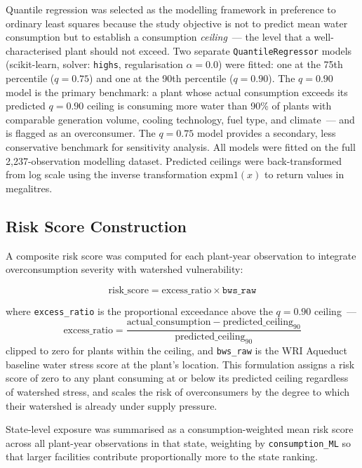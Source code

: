 \documentclass[11pt, letterpaper]{article}
\begin{document}
Quantile regression was selected as the modelling framework in preference to ordinary least squares because the study objective is not to predict mean water consumption but to establish a consumption \textit{ceiling}~--- the level that a well-characterised plant should not exceed. Two separate \texttt{QuantileRegressor} models (scikit-learn, solver: \texttt{highs}, regularisation $\alpha = 0.0$) were fitted: one at the 75th percentile ($q = 0.75$) and one at the 90th percentile ($q = 0.90$). The $q = 0.90$ model is the primary benchmark: a plant whose actual consumption exceeds its predicted $q = 0.90$ ceiling is consuming more water than 90\% of plants with comparable generation volume, cooling technology, fuel type, and climate~--- and is flagged as an overconsumer. The $q = 0.75$ model provides a secondary, less conservative benchmark for sensitivity analysis. All models were fitted on the full 2{,}237-observation modelling dataset. Predicted ceilings were back-transformed from log scale using the inverse transformation $\text{expm1}(x)$ to return values in megalitres.

\subsection{Risk Score Construction}

A composite risk score was computed for each plant-year observation to integrate overconsumption severity with watershed vulnerability:

\begin{equation}
  \text{risk\_score} = \text{excess\_ratio} \times \texttt{bws\_raw}
\end{equation}

where \texttt{excess\_ratio} is the proportional exceedance above the $q = 0.90$ ceiling~---
\[
  \text{excess\_ratio} = \frac{\text{actual\_consumption} - \text{predicted\_ceiling}_{90}}{\text{predicted\_ceiling}_{90}}
\]
clipped to zero for plants within the ceiling, and \texttt{bws\_raw} is the WRI Aqueduct baseline water stress score at the plant's location. This formulation assigns a risk score of zero to any plant consuming at or below its predicted ceiling regardless of watershed stress, and scales the risk of overconsumers by the degree to which their watershed is already under supply pressure.

State-level exposure was summarised as a consumption-weighted mean risk score across all plant-year observations in that state, weighting by \texttt{consumption\_ML} so that larger facilities contribute proportionally more to the state ranking.
\end{document}
